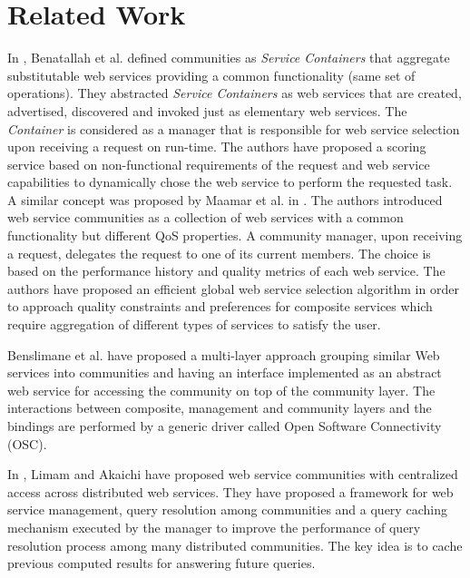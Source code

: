 \documentclass[10pt,journal,cspaper,compsoc]{IEEEtran}
\begin{document}
\section{Related Work}\label{s:related_work}

In \cite{DBLP:journals/internet/BenatallahSD03}, Benatallah et al.
defined communities as \emph{Service Containers} that aggregate
substitutable web services providing a common functionality (same
set of operations). They abstracted \emph{Service Containers} as
web services that are created, advertised, discovered and invoked
just as elementary web services. The \emph{Container} is
considered as a manager that is responsible for web service
selection upon receiving a request on run-time. The authors have
proposed a scoring service based on non-functional requirements of
the request and web service capabilities to dynamically chose the
web service to perform the requested task. A similar concept was
proposed by Maamar et al. in
\cite{DBLP:journals/ijebr/MaamarSTBB09}. The authors introduced
web service communities as a collection of web services with a
common functionality but different QoS properties. A community
manager, upon receiving a request, delegates the request to one of
its current members. The choice is based on the performance
history and quality metrics of each web service. The authors have
proposed an efficient global web service selection algorithm in
order to approach quality constraints and preferences for
composite services which require aggregation of different types of
services to satisfy the user.

Benslimane et al. \cite{Liris-2770} have proposed a multi-layer
approach grouping similar Web services into communities and having
an interface implemented as an abstract web service for accessing
the community on top of the community layer. The interactions
between composite, management and community layers and the
bindings are performed by a generic driver called Open Software
Connectivity (OSC).

In \cite{managing-hela-jalel}, Limam and Akaichi have proposed web
service communities with centralized access across distributed web
services. They have proposed a framework for web service
management, query resolution among communities and a query caching
mechanism executed by the manager to improve the performance of
query resolution process among many distributed communities. The
key idea is to cache previous computed results for answering
future queries.
\end{document}
